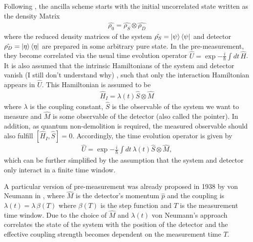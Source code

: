 \documentclass{article}
\newcommand\sj[1]{ {\color{orange} #1} }
\begin{document}
Following \cite{svenssonPedagogicalWeak2013}, the ancilla scheme starts with the initial uncorrelated 
state written as the density Matrix
\begin{align}
    \hat{\rho_0} =  \hat{\rho_S} \otimes  \hat{\rho_D}
\end{align}
where the reduced density matrices of the system $\hat{\rho_S} = \ket{\psi} \bra{\psi}$ and detector 
$\hat{\rho_D} = \ket{\eta} \bra{\eta}$ are prepared in some arbitrary pure state. In the pre-measurement, they 
become correlated via the usual time evolution operator $\hat{U} = \exp{ -\frac{i}{\hbar} \int dt \, \hat{H}}$. It is
also assumed that the intrinsic Hamiltonians of the system and detector vanish 
\sj{(I still don't understand why)}, 
such that only the interaction Hamiltonian appears in $\hat{U}$. This Hamiltonian is assumed to be
\begin{align}
    \hat{H}_{I} = \lambda (t) \hat{S} \otimes \hat{M}
\end{align}
where $\lambda$ is the coupling constant, $\hat{S}$ is the observable of the system we want to measure and $\hat{M}$
is some observable of the detector (also called the pointer). In addition, as quantum non-demolition is required, 
the measured observable should also fulfill $[\hat{H}_I, \hat{S}]=0$. Accordingly, the time evolution operator is given by 
\begin{align}
    \hat{U} = \exp{ -\frac{i}{\hbar} \int dt \,  \lambda (t) \hat{S}\otimes \hat{M} },
\end{align}
which can be further simplified by the assumption that the system and detector only interact in a 
finite time window. 

A particular version of pre-measurement was already proposed in 1938 by von Neumann in 
\cite{vonNeumannFoundationsQuantum2018}, where $\hat{M}$ is the detector's momentum $\hat{p}$ and the 
coupling is $\lambda (t) = \lambda \, \beta (T)$ where $\beta (T)$ is 
the step function and $T$ is the measurement time window. Due to the choice of $\hat{M}$ and $\lambda(t)$
von Neumann's approach correlates the state of the system with the position of the detector and the  effective coupling strength becomes dependent on the measurement time $T$. 
\end{document}
